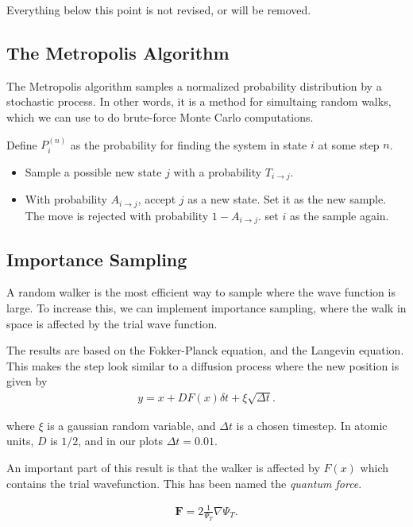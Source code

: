 \documentclass[twocolumns, a4paper,11pt,fleqn]{extarticle}
\renewcommand\vec[1]{\boldsymbol{\mathbf{#1}}}
\begin{document}
\clearpage
{\Huge Everything below this point is not revised, or will be removed.}

\subsection{The Metropolis Algorithm}
The Metropolis algorithm samples a normalized probability distribution
by a stochastic process. In other words, it is a method for simultaing
random walks, which we can use to do brute-force Monte Carlo computations.

Define $P^{(n)}_i$ as the probability for finding the system in state $i$
at some step $n$.

\begin{itemize}
	\item Sample a possible new state $j$ with a probability $T_{i\rightarrow j}$.
	\item With probability $A_{i\rightarrow j}$, accept $j$ as a new state.
	Set it as the new sample. The move is rejected with probability $1-A_{i\rightarrow j}$.
	set $i$ as the sample again.
\end{itemize}


\subsection{Importance Sampling}
A random walker is the most efficient way to sample where the
wave function is large. To increase this, we can implement importance
sampling, where the walk in space is affected by the trial wave function. 

The results are based on the Fokker-Planck equation, and the Langevin 
equation. This makes the step look similar to a diffusion process
where the new position is given by
\begin{align*}
y = x + DF(x) \delta t + \xi \sqrt{\Delta t}.
\end{align*}

where $\xi $ is a gaussian random variable, and $\Delta t$ is a chosen timestep.
In atomic units, $D$ is $1/2$, and in our plots $\Delta t = 0.01$. 

An important part of this result is that the walker is affected by $F(x)$
which contains the trial wavefunction. This has been named the \textit{quantum 
force}. 

\begin{align*}
\vec F = 2\frac{1}{\Psi_T}\nabla \Psi_T. 
\end{align*}
\end{document}
